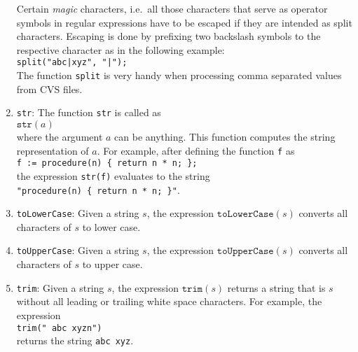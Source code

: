 \begin{enumerate}
      Certain \emph{magic} characters, i.e.~all those characters that serve as operator
      symbols in regular expressions have to be escaped if they are intended as split
      characters.  Escaping is done by prefixing two backslash symbols to the respective 
      character as in the following example:
      \\[0.2cm]
      \hspace*{1.3cm}
      \texttt{split("abc|xyz", "|");}
      \\[0.2cm]
      The function \texttt{split} is very handy when processing comma separated values from
      \textsc{CVS} files.
\item \texttt{str}:  The function \texttt{str} is called as
      \\[0.2cm]
      \hspace*{1.3cm}
      $\texttt{str}(a)$
      \\[0.2cm]
      where the argument $a$ can be anything.  This function computes the string
      representation of $a$.  For example, after defining the function \texttt{f} as
      \\[0.2cm]
      \hspace*{1.3cm}
      \texttt{f := procedure(n) \{ return n * n; \};}
      \\[0.2cm]
      the expression \texttt{str(f)} evaluates to the string
      \\[0.2cm]
      \hspace*{1.3cm}
      \texttt{"procedure(n) \{ return n * n; \}"}.      
\item \texttt{toLowerCase}:  Given a string $s$, the expression $\texttt{toLowerCase}(s)$
      converts all characters of $s$ to lower case.
\item \texttt{toUpperCase}:  Given a string $s$, the expression $\texttt{toUpperCase}(s)$
      converts all characters of $s$ to upper case.
\item \texttt{trim}:  Given a string $s$, the expression $\mathtt{trim}(s)$ returns a
      string that is $s$ without all leading or trailing white space characters.  For
      example, the expression
      \\[0.2cm]
      \hspace*{1.3cm}
      \texttt{trim("  abc xyzn")}
      \\[0.2cm]
      returns the string \texttt{abc xyz}.
\end{enumerate}


